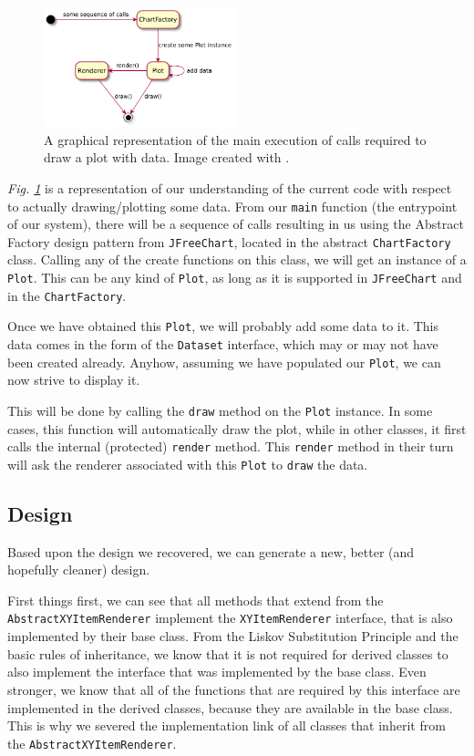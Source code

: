 \documentclass[11pt]{article}
\begin{document}
	\begin{figure}[H]
		\centering
		\includegraphics[width=0.5\textwidth]{pictures/draw-seq.pdf}
		\caption{A graphical representation of the main execution of calls required to draw a plot with data. Image created with \cite{plantuml}.}
		\label{fig:draw-seq}
	\end{figure}

	\textsl{Fig. \ref{fig:draw-seq}} is a representation of our understanding of the current code with respect to actually drawing/plotting some data. From our \texttt{main} function (the entrypoint of our system), there will be a sequence of calls resulting in us using the \textsf{Abstract Factory} design pattern from \texttt{JFreeChart}, located in the abstract \texttt{ChartFactory} class. Calling any of the create functions on this class, we will get an instance of a \texttt{Plot}. This can be any kind of \texttt{Plot}, as long as it is supported in \texttt{JFreeChart} and in the \texttt{ChartFactory}.
	
	Once we have obtained this \texttt{Plot}, we will probably add some data to it. This data comes in the form of the \texttt{Dataset} interface, which may or may not have been created already. Anyhow, assuming we have populated our \texttt{Plot}, we can now strive to display it.
	
	This will be done by calling the \texttt{draw} method on the \texttt{Plot} instance. In some cases, this function will automatically draw the plot, while in other classes, it first calls the internal (protected) \texttt{render} method. This \texttt{render} method in their turn will ask the renderer associated with this \texttt{Plot} to \texttt{draw} the data.

	\subsection{Design}
	\label{sec:design}
	Based upon the design we recovered, we can generate a new, better (and hopefully cleaner) design.
	
	First things first, we can see that all methods that extend from the \texttt{AbstractXYItemRenderer} implement the \texttt{XYItemRenderer} interface, that is also implemented by their base class. From the \textsf{Liskov Substitution Principle} \cite{Liskov94abehavioral} and the basic rules of inheritance, we know that it is not required for derived classes to also implement the interface that was implemented by the base class. Even stronger, we know that all of the functions that are required by this interface are implemented in the derived classes, because they are available in the base class. This is why we severed the implementation link of all classes that inherit from the \texttt{AbstractXYItemRenderer}.
	
\end{document}
